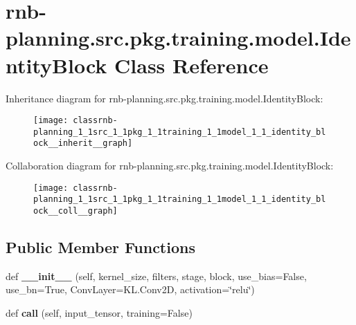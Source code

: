 \hypertarget{classrnb-planning_1_1src_1_1pkg_1_1training_1_1model_1_1_identity_block}{}\section{rnb-\/planning.src.\+pkg.\+training.\+model.\+Identity\+Block Class Reference}
\label{classrnb-planning_1_1src_1_1pkg_1_1training_1_1model_1_1_identity_block}


Inheritance diagram for rnb-\/planning.src.\+pkg.\+training.\+model.\+Identity\+Block\+:
\nopagebreak
\begin{figure}[H]
\begin{center}
\leavevmode
\texttt{[image: classrnb-planning\_1\_1src\_1\_1pkg\_1\_1training\_1\_1model\_1\_1\_identity\_block\_\_inherit\_\_graph]}
\end{center}
\end{figure}


Collaboration diagram for rnb-\/planning.src.\+pkg.\+training.\+model.\+Identity\+Block\+:
\nopagebreak
\begin{figure}[H]
\begin{center}
\leavevmode
\texttt{[image: classrnb-planning\_1\_1src\_1\_1pkg\_1\_1training\_1\_1model\_1\_1\_identity\_block\_\_coll\_\_graph]}
\end{center}
\end{figure}
\subsection*{Public Member Functions}
\begin{DoxyCompactItemize}
\item 
\mbox{\label{classrnb-planning_1_1src_1_1pkg_1_1training_1_1model_1_1_identity_block_a0a92c5d20625b4d04e554e9ca45e12bb}} 
def {\bfseries \+\_\+\+\_\+init\+\_\+\+\_\+} (self, kernel\+\_\+size, filters, stage, block, use\+\_\+bias=False, use\+\_\+bn=True, Conv\+Layer=K\+L.\+Conv2D, activation=\char`\"{}relu\char`\"{})
\item 
\mbox{\label{classrnb-planning_1_1src_1_1pkg_1_1training_1_1model_1_1_identity_block_aece525994523d4ce384d501164e3f6e9}} 
def {\bfseries call} (self, input\+\_\+tensor, training=False)
\end{DoxyCompactItemize}
